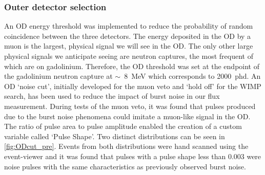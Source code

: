 \subsubsection{Outer detector selection}
An OD energy threshold was implemented to reduce the probability of random coincidence between the three detectors. The energy deposited in the OD by a muon is the largest, physical signal we will see in the OD. The only other large physical signals we anticipate seeing are neutron captures, the most frequent of which are on gadolinium. Therefore, the OD threshold was set at the endpoint of the gadolinium neutron capture at $\sim$~8~MeV which corresponds to 2000~phd.
An OD `noise cut', initially developed for the muon veto and `hold off' for the WIMP search, has been used to reduce the impact of burst noise in our flux measurement. During tests of the muon veto, it was found that pulses produced due to the burst noise phenomena could imitate a muon-like signal in the OD. The ratio of pulse area to pulse amplitude enabled the creation of a custom variable called `Pulse Shape'.
Two distinct distributions can be seen in \autoref{fig:ODcut_pre}. Events from both distributions were hand scanned using the event-viewer and it was found that pulses with a pulse shape less than 0.003 were noise pulses with the same characteristics as previously observed burst noise. 
